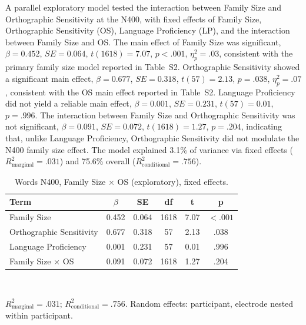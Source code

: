 \documentclass[11pt]{article}
\begin{document}
A parallel exploratory model tested the interaction between Family Size and Orthographic Sensitivity at the N400, with fixed effects of Family Size, Orthographic Sensitivity (OS), Language Proficiency (LP), and the interaction between Family Size and OS. The main effect of Family Size was significant, $\beta = 0.452$, $SE = 0.064$, $t(1618) = 7.07$, $p < .001$, $\eta^2_p = .03$, consistent with the primary family size model reported in Table~S2. Orthographic Sensitivity showed a significant main effect, $\beta = 0.677$, $SE = 0.318$, $t(57) = 2.13$, $p = .038$, $\eta^2_p = .07$, consistent with the OS main effect reported in Table~S2. Language Proficiency did not yield a reliable main effect, $\beta = 0.001$, $SE = 0.231$, $t(57) = 0.01$, $p = .996$. The interaction between Family Size and Orthographic Sensitivity was not significant, $\beta = 0.091$, $SE = 0.072$, $t(1618) = 1.27$, $p = .204$, indicating that, unlike Language Proficiency, Orthographic Sensitivity did not modulate the N400 family size effect. The model explained 3.1\% of variance via fixed effects ($R^2_{\mathrm{marginal}} = .031$) and 75.6\% overall ($R^2_{\mathrm{conditional}} = .756$).

\begin{table}[h!]
	\centering
	\small
	\caption{Words N400, Family Size $\times$ OS (exploratory), fixed effects.}
	\label{tab:s4b}
	\begin{tabular}{lccccc}
		\toprule
		\textbf{Term} & $\beta$ & \textbf{SE} & \textbf{df} & \textbf{t} & \textbf{p} \\
		\midrule
		Family Size & 0.452 & 0.064 & 1618 & 7.07 & $< .001$ \\
		Orthographic Sensitivity & 0.677 & 0.318 & 57 & 2.13 & .038 \\
		Language Proficiency & 0.001 & 0.231 & 57 & 0.01 & .996 \\
		Family Size $\times$ OS & 0.091 & 0.072 & 1618 & 1.27 & .204 \\
		\bottomrule
	\end{tabular}
	\\[4pt]
	\raggedright \footnotesize $R^2_{\mathrm{marginal}} = .031$; $R^2_{\mathrm{conditional}} = .756$. Random effects: participant, electrode nested within participant.
\end{table}



\end{document}

